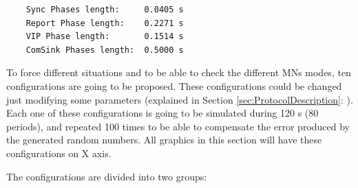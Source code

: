 \begin{verbatim}
    Sync Phases length:     0.0405 s
    Report Phase length:    0.2271 s
    VIP Phase length:       0.1514 s
    ComSink Phases length:  0.5000 s
\end{verbatim}

To force different situations and to be able to check the different \acp{MN} modes, ten configurations are going to be proposed. These 
configurations could be changed just modifying some parameters (explained in Section \ref{sec:ProtocolDescription}: ). 
Each one of these configurations is going to be simulated during 120 s (80 periods), and repeated 100 times to be able to compensate the error 
produced by the generated random numbers. All graphics in this section will have these configurations on X axis.

The configurations are divided into two groups:

